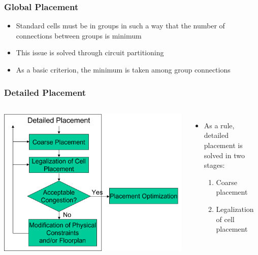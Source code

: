 \documentclass[compress]{beamer}
\begin{document}
\begin{frame}
	\frametitle{Global Placement}
	\begin{itemize}
		\item Standard cells must be in groups in such a way that the number of connections between groups is minimum
		\pause
		\item This issue is solved through circuit partitioning \pause
		\item As a basic criterion, the minimum is taken among group connections
	\end{itemize}
		\begin{center}
		\end{center}
\end{frame}
\begin{frame}
	\frametitle{Detailed Placement}
	\begin{columns}	
		\begin{center}
			\includegraphics[width=0.8 \textwidth]{DP}
		\end{center}
		\begin{itemize}
			\item As a rule, detailed placement is solved in two stages: 
			\begin{enumerate}
				\item Coarse placement
				\item Legalization of cell placement
			\end{enumerate}
		\end{itemize}
	\end{columns}
\end{frame}
\end{document}
